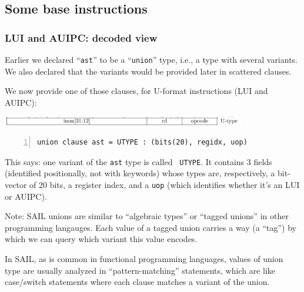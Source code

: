 \documentclass[aspectratio=169]{beamer}
\newcommand{\slidefont}{\scriptsize}
\newcommand{\cf}{\scriptsize\tt}
\begin{document}

\subsection{Some base instructions}


\begin{frame}[fragile]
  \frametitle{LUI and AUIPC: decoded view}

  \slidefont

  Earlier we declared ``{\cf ast}'' to be a ``{\cf union}'' type,
  i.e., a type with several variants.  We also declared that the
  variants would be provided later in scattered clauses.

  \vspace{1ex}
    
  We now provide one of those clauses, for U-format instructions (LUI and AUIPC):

  \begin{center}
    \includegraphics[width=0.8\textwidth]{Figures/Fig_RISCV_U_format.png}
  \end{center}

  \vspace{1ex}
    
  \begin{Verbatim}[frame=single, numbers=left, label = File riscv\_insts\_base.sail]
union clause ast = UTYPE : (bits(20), regidx, uop)
  \end{Verbatim}

  \begin{minipage}{\textwidth}
    This says: one variant of the {\cf ast} type is called {\cf
      UTYPE}.  It contains 3 fields (identified positionally, not with
    keywords) whose types are, respectively, a bit-vector of 20 bits,
    a register index, and a {\cf uop} (which identifies whether it's
    an LUI or AUIPC).

    \vspace{1ex}

    Note: SAIL unions are similar to ``algebraic types'' or ``tagged
    unions'' in other programming langauges.  Each value of a tagged
    union carries a way (a ``tag'') by which we can query which
    variant this value encodes.

    \vspace{1ex}

    In SAIL, as is common in functional programming languages, values
    of union type are usually analyzed in ``pattern-matching''
    statements, which are like case/switch statements where each
    clause matches a variant of the union.
  \end{minipage}

\end{frame}
\end{document}
